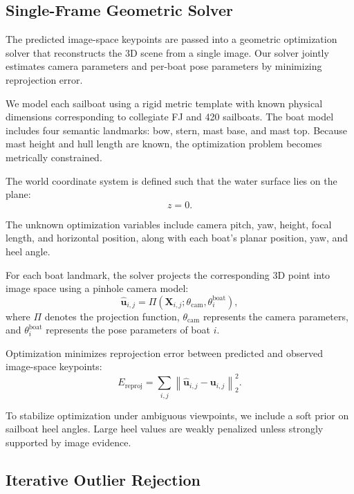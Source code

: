 \subsection{Single-Frame Geometric Solver}

The predicted image-space keypoints are passed into a geometric optimization solver that reconstructs the 3D scene from a single image. Our solver jointly estimates camera parameters and per-boat pose parameters by minimizing reprojection error.

We model each sailboat using a rigid metric template with known physical dimensions corresponding to collegiate FJ and 420 sailboats. The boat model includes four semantic landmarks: bow, stern, mast base, and mast top. Because mast height and hull length are known, the optimization problem becomes metrically constrained.

The world coordinate system is defined such that the water surface lies on the plane:
\begin{equation}
z = 0.
\end{equation}

The unknown optimization variables include camera pitch, yaw, height, focal length, and horizontal position, along with each boat's planar position, yaw, and heel angle.

For each boat landmark, the solver projects the corresponding 3D point into image space using a pinhole camera model:
\begin{equation}
\hat{\mathbf{u}}_{i,j} = \Pi(\mathbf{X}_{i,j}; \theta_{\text{cam}}, \theta_i^{\text{boat}}),
\end{equation}
where $\Pi$ denotes the projection function, $\theta_{\text{cam}}$ represents the camera parameters, and $\theta_i^{\text{boat}}$ represents the pose parameters of boat $i$.

Optimization minimizes reprojection error between predicted and observed image-space keypoints:
\begin{equation}
E_{\text{reproj}} =
\sum_{i,j}
\left\|
\hat{\mathbf{u}}_{i,j}
-
\mathbf{u}_{i,j}
\right\|_2^2.
\end{equation}

To stabilize optimization under ambiguous viewpoints, we include a soft prior on sailboat heel angles. Large heel values are weakly penalized unless strongly supported by image evidence.

\subsection{Iterative Outlier Rejection}

